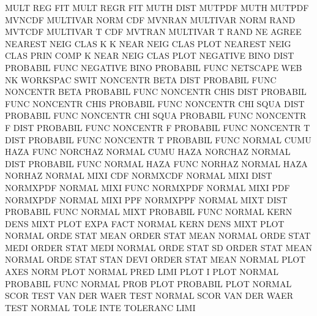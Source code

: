 MULT     REG                            FIT
MULT     REGR                           FIT
MUTH     DIST                           MUTPDF
MUTH                                    MUTPDF
MVNCDF                                  MULTIVAR NORM CDF
MVNRAN                                  MULTIVAR NORM RAND
MVTCDF                                  MULTIVAR T    CDF
MVTRAN                                  MULTIVAR T    RAND
NE                                      AGREE
NEAREST  NEIG CLAS K                    K        NEAR NEIG CLAS PLOT
NEAREST  NEIG CLAS PRIN COMP            K        NEAR NEIG CLAS PLOT
NEGATIVE BINO DIST                      PROBABIL FUNC
NEGATIVE BINO                           PROBABIL FUNC
NETSCAPE                                WEB
NK                                      WORKSPAC SWIT
NONCENTR BETA DIST                      PROBABIL FUNC
NONCENTR BETA                           PROBABIL FUNC
NONCENTR CHIS DIST                      PROBABIL FUNC
NONCENTR CHIS                           PROBABIL FUNC
NONCENTR CHI  SQUA DIST                 PROBABIL FUNC
NONCENTR CHI  SQUA                      PROBABIL FUNC
NONCENTR F    DIST                      PROBABIL FUNC
NONCENTR F                              PROBABIL FUNC
NONCENTR T    DIST                      PROBABIL FUNC
NONCENTR T                              PROBABIL FUNC
NORMAL   CUMU HAZA FUNC                 NORCHAZ
NORMAL   CUMU HAZA                      NORCHAZ
NORMAL   DIST                           PROBABIL FUNC
NORMAL   HAZA FUNC                      NORHAZ
NORMAL   HAZA                           NORHAZ
NORMAL   MIXI CDF                       NORMXCDF
NORMAL   MIXI DIST                      NORMXPDF
NORMAL   MIXI FUNC                      NORMXPDF
NORMAL   MIXI PDF                       NORMXPDF
NORMAL   MIXI PPF                       NORMXPPF
NORMAL   MIXT DIST                      PROBABIL FUNC
NORMAL   MIXT                           PROBABIL FUNC
NORMAL   KERN DENS MIXT PLOT EXPA FACT  NORMAL   KERN DENS MIXT PLOT
NORMAL   ORDE STAT MEAN                 ORDER    STAT MEAN
NORMAL   ORDE STAT MEDI                 ORDER    STAT MEDI
NORMAL   ORDE STAT SD                   ORDER    STAT MEAN
NORMAL   ORDE STAT STAN DEVI            ORDER    STAT MEAN
NORMAL   PLOT AXES                      NORM     PLOT
NORMAL   PRED LIMI PLOT                 I        PLOT
NORMAL                                  PROBABIL FUNC
NORMAL   PROB PLOT                      PROBABIL PLOT
NORMAL   SCOR TEST                      VAN      DER  WAER TEST
NORMAL   SCOR                           VAN      DER  WAER TEST
NORMAL   TOLE INTE                      TOLERANC LIMI
